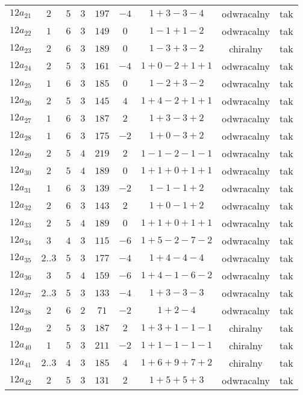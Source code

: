 \begin{longtable}{ccccccccc}
$12a_{21}$ & $2$ & $5$ & $3$ & $197$ & $-4$ & $1+3-3-4$ & odwracalny & tak \\
$12a_{22}$ & $1$ & $6$ & $3$ & $149$ & $0$ & $1-1+1-2$ & odwracalny & tak \\
$12a_{23}$ & $2$ & $6$ & $3$ & $189$ & $0$ & $1-3+3-2$ & chiralny & tak \\
$12a_{24}$ & $2$ & $5$ & $3$ & $161$ & $-4$ & $1+0-2+1+1$ & odwracalny & tak \\
$12a_{25}$ & $1$ & $6$ & $3$ & $185$ & $0$ & $1-2+3-2$ & odwracalny & tak \\
$12a_{26}$ & $2$ & $5$ & $3$ & $145$ & $4$ & $1+4-2+1+1$ & odwracalny & tak \\
$12a_{27}$ & $1$ & $6$ & $3$ & $187$ & $2$ & $1+3-3+2$ & odwracalny & tak \\
$12a_{28}$ & $1$ & $6$ & $3$ & $175$ & $-2$ & $1+0-3+2$ & odwracalny & tak \\
$12a_{29}$ & $2$ & $5$ & $4$ & $219$ & $2$ & $1-1-2-1-1$ & odwracalny & tak \\
$12a_{30}$ & $2$ & $5$ & $4$ & $189$ & $0$ & $1+1+0+1+1$ & odwracalny & tak \\
$12a_{31}$ & $1$ & $6$ & $3$ & $139$ & $-2$ & $1-1-1+2$ & odwracalny & tak \\
$12a_{32}$ & $2$ & $6$ & $3$ & $143$ & $2$ & $1+0-1+2$ & odwracalny & tak \\
$12a_{33}$ & $2$ & $5$ & $4$ & $189$ & $0$ & $1+1+0+1+1$ & odwracalny & tak \\
$12a_{34}$ & $3$ & $4$ & $3$ & $115$ & $-6$ & $1+5-2-7-2$ & odwracalny & tak \\
$12a_{35}$ & $2..3$ & $5$ & $3$ & $177$ & $-4$ & $1+4-4-4$ & odwracalny & tak \\
$12a_{36}$ & $3$ & $5$ & $4$ & $159$ & $-6$ & $1+4-1-6-2$ & odwracalny & tak \\
$12a_{37}$ & $2..3$ & $5$ & $3$ & $133$ & $-4$ & $1+3-3-3$ & odwracalny & tak \\
$12a_{38}$ & $2$ & $6$ & $2$ & $71$ & $-2$ & $1+2-4$ & odwracalny & tak \\
$12a_{39}$ & $2$ & $5$ & $3$ & $187$ & $2$ & $1+3+1-1-1$ & chiralny & tak \\
$12a_{40}$ & $1$ & $5$ & $3$ & $211$ & $-2$ & $1+1-1-1-1$ & chiralny & tak \\
$12a_{41}$ & $2..3$ & $4$ & $3$ & $185$ & $4$ & $1+6+9+7+2$ & chiralny & tak \\
$12a_{42}$ & $2$ & $5$ & $3$ & $131$ & $2$ & $1+5+5+3$ & odwracalny & tak \\

\end{longtable}
